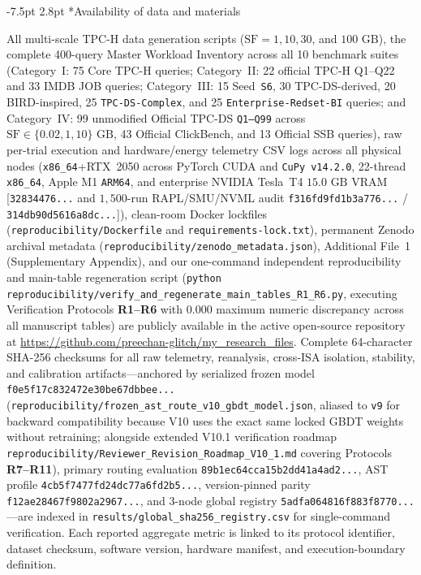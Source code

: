 \documentclass[10pt,a4paper]{article}
\makeatletter
\renewcommand\subsection{\@startsection{subsection}{2}{\z@}%
  {-7.5pt \@plus -2pt \@minus -1pt}%
  {2.8pt \@plus 1pt}%
  {\normalfont\normalsize\bfseries}}
\makeatother
\begin{document}
\subsection*{Availability of data and materials}
{\scriptsize All multi-scale TPC-H data generation scripts ($\text{SF}=1, 10, 30$, and $100\text{ GB}$), the complete 400-query Master Workload Inventory across all 10 benchmark suites (Category~I: 75 Core TPC-H queries; Category~II: 22 official TPC-H Q1--Q22 and 33 IMDB JOB queries; Category~III: 15 Seed~\texttt{S6}, 30 TPC-DS-derived, 20 BIRD-inspired, 25 \texttt{TPC-DS-Complex}, and 25 \texttt{Enterprise-Redset-BI} queries; and Category~IV: 99 unmodified Official TPC-DS \texttt{Q1--Q99} across $\text{SF}\in\{0.02, 1, 10\}\text{ GB}$, 43 Official ClickBench, and 13 Official SSB queries), raw per-trial execution and hardware/energy telemetry CSV logs across all physical nodes (\texttt{x86\_64}+RTX~2050 across PyTorch CUDA and \texttt{CuPy v14.2.0}, 22-thread \texttt{x86\_64}, Apple M1 \texttt{ARM64}, and enterprise NVIDIA Tesla~T4 $15.0\text{ GB}$ VRAM [\texttt{32834476...} and $1{,}500$-run RAPL/SMU/NVML audit \texttt{f316fd9fd1b3a776...} / \texttt{314db90d5616a8dc...}]), clean-room Docker lockfiles (\texttt{reproducibility/\allowbreak{}Dockerfile} and \texttt{requirements-\allowbreak{}lock.txt}), permanent Zenodo archival metadata (\texttt{reproducibility/\allowbreak{}zenodo\_\allowbreak{}metadata.json}), Additional File~1 (Supplementary Appendix), and our one-command independent reproducibility and main-table regeneration script (\texttt{python reproducibility/verify\_\allowbreak{}and\_\allowbreak{}regenerate\_\allowbreak{}main\_\allowbreak{}tables\_\allowbreak{}R1\_\allowbreak{}R6.py}, executing Verification Protocols \textbf{R1--R6} with $0.000$ maximum numeric discrepancy across all manuscript tables) are publicly available in the active open-source repository at \url{https://github.com/preechan-glitch/my_research_files}. Complete 64-character SHA-256 checksums for all raw telemetry, reanalysis, cross-ISA isolation, stability, and calibration artifacts---anchored by serialized frozen model \texttt{f0e5f17c832472e30be67dbbee...} (\texttt{reproducibility/\allowbreak{}frozen\_\allowbreak{}ast\_\allowbreak{}route\_\allowbreak{}v10\_\allowbreak{}gbdt\_\allowbreak{}model.json}, aliased to \texttt{v9} for backward compatibility because V10 uses the exact same locked GBDT weights without retraining; alongside extended V10.1 verification roadmap \texttt{reproducibility/\allowbreak{}Reviewer\_\allowbreak{}Revision\_\allowbreak{}Roadmap\_\allowbreak{}V10\_1.md} covering Protocols \textbf{R7--R11}), primary routing evaluation \texttt{89b1ec64cca15b2dd41a4ad2...}, AST profile \texttt{4cb5f7477fd24dc77a6fd2b5...}, version-pinned parity \texttt{f12ae28467f9802a2967...}, and 3-node global registry \texttt{5adfa064816f883f8770...}---are indexed in \texttt{results/\allowbreak{}global\_\allowbreak{}sha256\_\allowbreak{}registry.csv} for single-command verification. Each reported aggregate metric is linked to its protocol identifier, dataset checksum, software version, hardware manifest, and execution-boundary definition.\par}
\vspace{-5pt}
\end{document}
